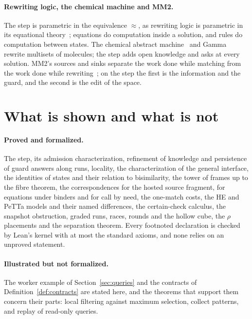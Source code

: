 \documentclass[11pt]{article}
\theoremstyle{plain}
\theoremstyle{definition}
\theoremstyle{remark}
\begin{document}
\paragraph{Rewriting logic, the chemical machine and MM2.} The step is parametric in the
equivalence $\approx$, as rewriting logic is parametric in its equational
theory~\cite{meseguer-rewriting}; equations do computation inside a solution, and rules do
computation between states. The chemical abstract machine~\cite{berry-boudol-cham} and
Gamma~\cite{banatre-metayer-gamma} rewrite multisets of molecules; the step adds open knowledge and
asks at every solution. MM2's sources and sinks separate the work done while matching from the
work done while rewriting~\cite{mork-sources-sinks}; on the step the first is the information and
the guard, and the second is the edit of the space.

\section{What is shown and what is not}\label{sec:shown}

\paragraph{Proved and formalized.} The step, its admission characterization, refinement of
knowledge and persistence of guard answers along runs, locality, the characterization of the
general interface, the identities of states and their relation to bisimilarity, the tower of
frames up to the fibre theorem, the correspondences for the hosted source fragment, for equations
under binders and for call by need, the one-match costs, the HE and PeTTa models and their named
differences, the certain-check calculus, the snapshot obstruction, graded runs, races, rounds and
the hollow cube, the $\rho$ placements and the separation theorem. Every footnoted declaration is
checked by Lean's kernel with at most the standard axioms, and none relies on an unproved
statement.

\paragraph{Illustrated but not formalized.} The worker example of Section~\ref{sec:queries} and
the contracts of Definition~\ref{def:contracts} are stated here, and the theorems that support
them concern their parts: local filtering against maximum selection, collect patterns, and
replay of read-only queries.
\end{document}
